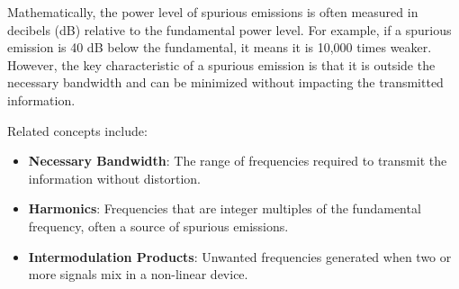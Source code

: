 Mathematically, the power level of spurious emissions is often measured in decibels (dB) relative to the fundamental power level. For example, if a spurious emission is 40 dB below the fundamental, it means it is 10,000 times weaker. However, the key characteristic of a spurious emission is that it is outside the necessary bandwidth and can be minimized without impacting the transmitted information.

Related concepts include:
\begin{itemize}
    \item \textbf{Necessary Bandwidth}: The range of frequencies required to transmit the information without distortion.
    \item \textbf{Harmonics}: Frequencies that are integer multiples of the fundamental frequency, often a source of spurious emissions.
    \item \textbf{Intermodulation Products}: Unwanted frequencies generated when two or more signals mix in a non-linear device.
\end{itemize}

